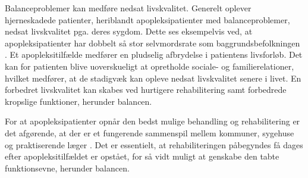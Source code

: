 Balanceproblemer kan medføre nedsat livskvalitet. Generelt oplever hjerneskadede patienter, heriblandt apopleksipatienter med balanceproblemer, nedsat livskvalitet pga. deres sygdom. Dette ses eksempelvis ved, at apopleksipatienter har dobbelt så stor selvmordsrate som baggrundsbefolkningen \cite{Sundhedsstyrelsen2010}. Et apopleksitilfælde medfører en pludselig afbrydelse i patientens livsforløb. Det kan for patienten blive uoverskueligt at opretholde sociale- og familierelationer, hvilket medfører, at de stadigvæk kan opleve nedsat livskvalitet senere i livet. En forbedret livskvalitet kan skabes ved hurtigere rehabilitering samt forbedrede kropslige funktioner, herunder balancen. \cite{Sundhedsstyrelsen2010}

For at apopleksipatienter opnår den bedst mulige behandling og rehabilitering er det afgørende, at der er et fungerende sammenspil mellem kommuner, sygehuse og praktiserende læger \cite{Sundhedsstyrelsen2010}. Det er essentielt, at rehabiliteringen påbegyndes få dages efter apopleksitilfældet er opstået, for så vidt muligt at genskabe den tabte funktionsevne, herunder balancen. \cite{kruuse2015} 






